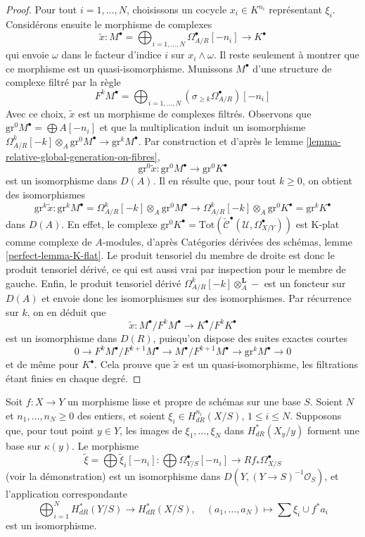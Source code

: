 \begin{proof}
\medskip\noindent
Pour tout $i = 1, \ldots, N$, choisissons un cocycle $x_i \in K^{n_i}$
représentant $\xi_i$. Considérons ensuite le morphisme de complexes
$$
\tilde x :
M^\bullet = \bigoplus\nolimits_{i = 1, \ldots, N}
\Omega^\bullet_{A/R}[-n_i]
\longrightarrow
K^\bullet
$$
qui envoie $\omega$ dans le facteur d'indice $i$ sur $x_i \wedge \omega$.
Il reste seulement à montrer que ce morphisme est un quasi-isomorphisme.
Munissons $M^\bullet$ d'une structure de complexe filtré
par la règle
$$
F^kM^\bullet =
\bigoplus\nolimits_{i = 1, \ldots, N}
(\sigma_{\geq k}\Omega^\bullet_{A/R})[-n_i]
$$
Avec ce choix, $\tilde x$ est un morphisme de complexes filtrés.
Observons que $\text{gr}^0M^\bullet = \bigoplus A[-n_i]$
et que la multiplication induit un isomorphisme
$\Omega^k_{A/R}[-k] \otimes_A \text{gr}^0M^\bullet \to \text{gr}^kM^\bullet$.
Par construction et d'après le lemme \ref{lemma-relative-global-generation-on-fibres},
$$
\text{gr}^0\tilde x :
\text{gr}^0M^\bullet \longrightarrow
\text{gr}^0K^\bullet
$$
est un isomorphisme dans $D(A)$. Il en résulte que, pour tout $k \geq 0$,
on obtient des isomorphismes
$$
\text{gr}^k \tilde x :
\text{gr}^kM^\bullet = \Omega^k_{A/R}[-k] \otimes_A \text{gr}^0M^\bullet
\longrightarrow
\Omega^k_{A/R}[-k] \otimes_A \text{gr}^0K^\bullet =
\text{gr}^kK^\bullet
$$
dans $D(A)$. En effet, le complexe
$\text{gr}^0K^\bullet =
\text{Tot}(\check{\mathcal{C}}^\bullet(\mathcal{U}, \Omega_{X/Y}^\bullet))$
est K-plat comme complexe de $A$-modules, d'après Catégories dérivées des schémas,
lemme \ref{perfect-lemma-K-flat}.
Le produit tensoriel du membre de droite est donc le
produit tensoriel dérivé, ce qui est aussi vrai par inspection pour le membre de gauche.
Enfin, le produit tensoriel dérivé
$\Omega^k_{A/R}[-k] \otimes_A^\mathbf{L} -$ est un foncteur sur $D(A)$
et envoie donc les isomorphismes sur des isomorphismes.
Par récurrence sur $k$, on en déduit que
$$
\tilde x : M^\bullet/F^kM^\bullet \to K^\bullet/F^kK^\bullet
$$
est un isomorphisme dans $D(R)$, puisqu'on dispose des suites exactes courtes
$$
0 \to F^kM^\bullet/F^{k + 1}M^\bullet \to
M^\bullet/F^{k + 1}M^\bullet \to
\text{gr}^kM^\bullet \to 0
$$
et de même pour $K^\bullet$. Cela prouve que $\tilde x$ est un
quasi-isomorphisme, les filtrations étant finies en chaque degré.
\end{proof}

\begin{proposition}
\label{proposition-global-generation-on-fibres}
Soit $f : X \to Y$ un morphisme lisse et propre de schémas sur une base $S$.
Soient $N$ et $n_1, \ldots, n_N \geq 0$ des entiers, et soient
$\xi_i \in H^{n_i}_{dR}(X/S)$, $1 \leq i \leq N$.
Supposons que, pour tout point $y \in Y$, les images de $\xi_1, \ldots, \xi_N$
dans $H^*_{dR}(X_y/y)$ forment une base sur $\kappa(y)$. Le morphisme
$$
\tilde \xi = \bigoplus \tilde \xi_i[-n_i] :
\bigoplus \Omega^\bullet_{Y/S}[-n_i]
\longrightarrow
Rf_*\Omega^\bullet_{X/S}
$$
(voir la démonstration) est un isomorphisme dans $D(Y, (Y \to S)^{-1}\mathcal{O}_S)$, et
l'application correspondante
$$
\bigoplus\nolimits_{i = 1}^N H^*_{dR}(Y/S) \longrightarrow
H^*_{dR}(X/S), \quad
(a_1, \ldots, a_N) \longmapsto  \sum \xi_i \cup f^*a_i
$$
est un isomorphisme.
\end{proposition}

